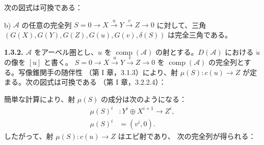 \clearpage
{}%
\begingroup\small\setlength{\parskip}{0pt}\setlength{\emergencystretch}{1.5em}
\setlength{\abovedisplayskip}{4pt plus 2pt minus 2pt}%
\setlength{\belowdisplayskip}{4pt plus 2pt minus 2pt}%

次の図式は可換である：

\begin{center}
\end{center}

\noindent b) $\mathcal A$ の任意の完全列
$S=0\longrightarrow X\xrightarrow{u}Y\xrightarrow{v}Z\longrightarrow0$
に対して、三角
$(G(X),\allowbreak G(Y),\allowbreak G(Z),\allowbreak G(u),\allowbreak
G(v),\allowbreak\delta(S))$ は完全三角である。

\medskip\noindent\textbf{1.3.2.}\quad
$\mathcal A$ をアーベル圏とし、$u$ を
$\operatorname{comp}(\mathcal A)$ の射とする。$D(\mathcal A)$ における
$\dot u$ の像を $[u]$ と書く。
$S=0\longrightarrow X\xrightarrow{u}Y\xrightarrow{v}Z\longrightarrow0$
を $\operatorname{comp}(\mathcal A)$ の完全列とする。写像錐関手の随伴性
（第 I 章，3.1.3）により、射
$\mu(S)\colon c(u)\longrightarrow Z$ が定まる。次の図式は可換である
（第 I 章，3.2.2.4）：

\begin{center}
\end{center}

簡単な計算により、射 $\mu(S)$ の成分は次のようになる：
\begin{equation}
\begin{aligned}
\mu(S)^i&\colon Y^i\oplus X^{i+1}\longrightarrow Z^i,\\
\mu(S)^i&=(v^i,0).
\end{aligned}
\tag{1.3.2.1}
\end{equation}
したがって、射 $\mu(S)\colon c(u)\longrightarrow Z$ はエピ射であり、
次の完全列が得られる：

